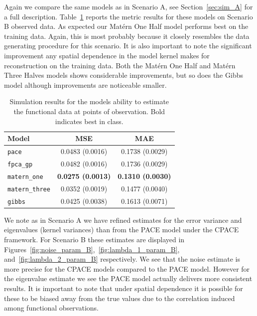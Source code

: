 Again we compare the same models as in Scenario A, see Section~\ref{sec:sim_A} for a full description.
Table~\ref{tab:train_B} reports the metric results for these models on Scenario B observed data.
As expected our Mat\'ern One Half model performs best on the training data.
Again, this is most probably because it closely resembles the data generating procedure for this scenario.
It is also important to note the significant improvement any spatial dependence in the model kernel makes for reconstruction on the training data.
Both the Mat\'ern One Half and Mat\'ern Three Halves models shows considerable improvements, but so does the Gibbs model although improvements are noticeable smaller.


\begin{table}
	\caption[Simulation results for Scenario B on observed data]{Simulation results for the models ability to estimate the functional data at points of observation. Bold indicates best in class.}
	\centering
	\label{tab:train_B}
	\begin{tabular}{lcc}
		\toprule
		\textbf{Model} & \textbf{MSE} & \textbf{MAE} \\
		\midrule
		\verb*|pace| & 0.0483 (0.0016) & 0.1738	(0.0029) \\
		\verb*|fpca_gp| & 0.0482 (0.0016) & 0.1736 (0.0029) \\
		\verb*|matern_one| & \textbf{0.0275	(0.0013)} & \textbf{0.1310	(0.0030)} \\
		\verb*|matern_three| & 0.0352 (0.0019) & 0.1477	(0.0040) \\
		\verb*|gibbs| & 0.0425 (0.0038) & 0.1613 (0.0071)\\
		\bottomrule
	\end{tabular}
\end{table}

We note as in Scenario A we have refined estimates for the error variance and eigenvalues (kernel variances) than from the PACE model under the CPACE framework. 
For Scenario B these estimates are displayed in Figures~\ref{fig:noise_param_B},~\ref{fig:lambda_1_param_B}, and~\ref{fig:lambda_2_param_B} respectively. 
We see that the noise estimate is more precise for the CPACE models compared to the PACE model.
However for the eigenvalue estimate we see the PACE model actually delivers more consistent results.
It is important to note that under spatial dependence it is possible for these to be biased away from the true values due to the correlation induced among functional observations.

